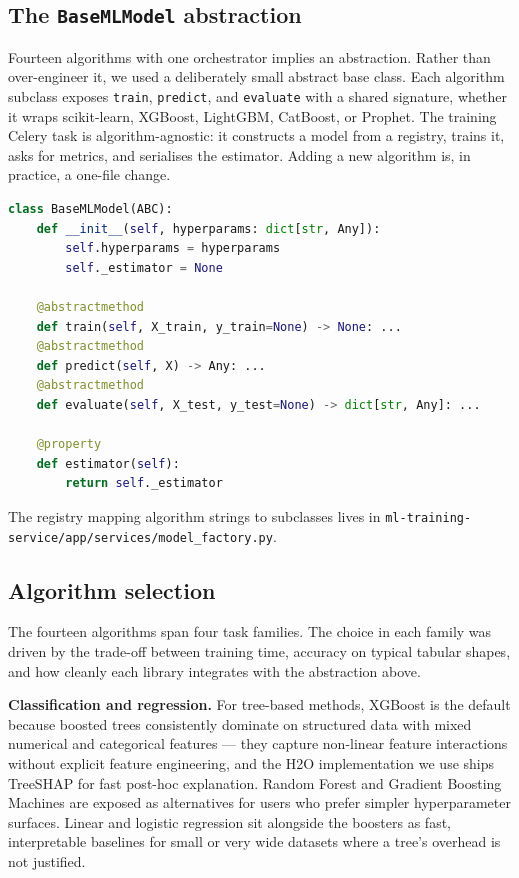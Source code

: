 \documentclass[12pt, a4paper, oneside]{report}
\begin{document}
\subsection{The \texttt{BaseMLModel} abstraction}

Fourteen algorithms with one orchestrator implies an abstraction.
Rather than over-engineer it, we used a deliberately small abstract
base class. Each algorithm subclass exposes \texttt{train},
\texttt{predict}, and \texttt{evaluate} with a shared signature,
whether it wraps scikit-learn, XGBoost, LightGBM, CatBoost, or
Prophet. The training Celery task is algorithm-agnostic: it
constructs a model from a registry, trains it, asks for metrics, and
serialises the estimator. Adding a new algorithm is, in practice, a
one-file change.

\begin{lstlisting}[language=Python, caption=Algorithm-agnostic training core]
class BaseMLModel(ABC):
    def __init__(self, hyperparams: dict[str, Any]):
        self.hyperparams = hyperparams
        self._estimator = None

    @abstractmethod
    def train(self, X_train, y_train=None) -> None: ...
    @abstractmethod
    def predict(self, X) -> Any: ...
    @abstractmethod
    def evaluate(self, X_test, y_test=None) -> dict[str, Any]: ...

    @property
    def estimator(self):
        return self._estimator
\end{lstlisting}

The registry mapping algorithm strings to subclasses lives in
\texttt{ml-training-service/app/services/model\_factory.py}.

\subsection{Algorithm selection}

The fourteen algorithms span four task families. The choice in each
family was driven by the trade-off between training time, accuracy on
typical tabular shapes, and how cleanly each library integrates with
the abstraction above.

\textbf{Classification and regression.} For tree-based methods,
XGBoost is the default because boosted trees consistently dominate on
structured data with mixed numerical and categorical features ---
they capture non-linear feature interactions without explicit
feature engineering, and the H2O implementation we use ships
TreeSHAP for fast post-hoc explanation. Random Forest and Gradient
Boosting Machines are exposed as alternatives for users who prefer
simpler hyperparameter surfaces. Linear and logistic regression sit
alongside the boosters as fast, interpretable baselines for small or
very wide datasets where a tree's overhead is not justified.
\end{document}
